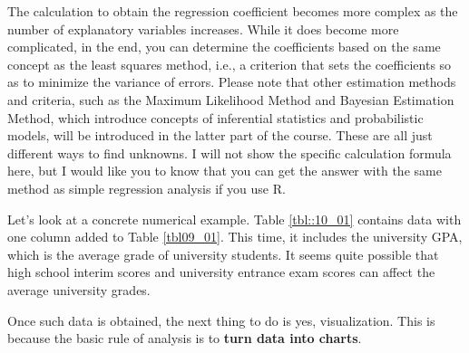 \documentclass{ltjbook}
\begin{document}
The calculation to obtain the regression coefficient becomes more complex as the number of explanatory variables increases. While it does become more complicated, in the end, you can determine the coefficients based on the same concept as the least squares method, i.e., a criterion that sets the coefficients so as to minimize the variance of errors. Please note that other estimation methods and criteria, such as the Maximum Likelihood Method and Bayesian Estimation Method, which introduce concepts of inferential statistics and probabilistic models, will be introduced in the latter part of the course. These are all just different ways to find unknowns. I will not show the specific calculation formula here, but I would like you to know that you can get the answer with the same method as simple regression analysis if you use R.

Let's look at a concrete numerical example. Table \ref{tbl::10_01} contains data with one column added to Table \ref{tbl09_01}. This time, it includes the university GPA, which is the average grade of university students. It seems quite possible that high school interim scores and university entrance exam scores can affect the average university grades.


Once such data is obtained, the next thing to do is yes, visualization. This is because the basic rule of analysis is to \textbf{turn data into charts}.
\end{document}
